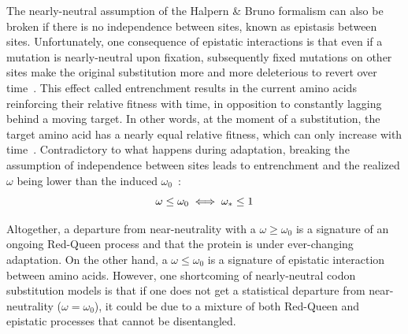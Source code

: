 The \gls{nearly-neutral} assumption of the Halpern \& Bruno formalism can also be broken if there is no independence between sites, known as epistasis between sites.
Unfortunately, one consequence of epistatic interactions is that even if a mutation is \gls{nearly-neutral} upon fixation, subsequently fixed mutations on other sites make the original \gls{substitution} more and more deleterious to revert over time~\citep{Gong2014, Lunzer2010, Mccandlish2013}.
This effect called entrenchment results in the current amino acids reinforcing their relative fitness with time, in opposition to constantly lagging behind a moving target.
In other words, at the moment of a \gls{substitution}, the target amino acid has a nearly equal relative fitness, which can only increase with time~\citep{Goldstein2016, Goldstein2017}.
Contradictory to what happens during adaptation, breaking the assumption of independence between sites leads to entrenchment and the realized $\omega$ being lower than the induced $\omega_0$~\citep{Rodrigue2016}:
\begin{equation}
    \omega \leq \omega_0 \\
    \iff \omega_* \leq 1
\end{equation}

Altogether, a departure from near-neutrality with a $\omega \geq \omega_0$ is a signature of an ongoing Red-Queen process and that the protein is under ever-changing adaptation.
On the other hand, a $\omega \leq \omega_0$ is a signature of epistatic interaction between amino acids.
However, one shortcoming of \gls{nearly-neutral} \gls{codon} \gls{substitution} models is that if one does not get a statistical departure from near-neutrality ($\omega = \omega_0$), it could be due to a mixture of both Red-Queen and epistatic processes that cannot be disentangled.